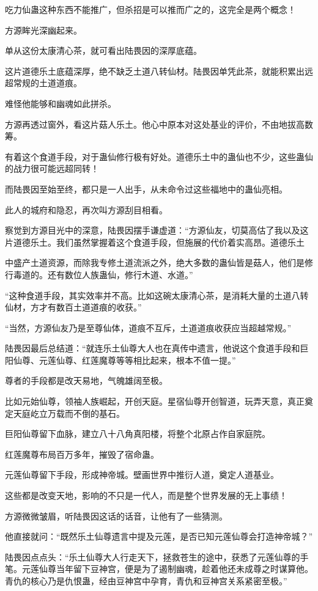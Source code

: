 \begin{this_body}
吃力仙蛊这种东西不能推广，但杀招是可以推而广之的，这完全是两个概念！

方源眸光深幽起来。

单从这份太康清心茶，就可看出陆畏因的深厚底蕴。

这片道德乐土底蕴深厚，绝不缺乏土道八转仙材。陆畏因单凭此茶，就能积累出远超常规的土道道痕。

难怪他能够和幽魂如此拼杀。

方源再透过窗外，看这片菇人乐土。他心中原本对这处基业的评价，不由地拔高数筹。

有着这个食道手段，对于蛊仙修行极有好处。道德乐土中的蛊仙也不少，这些蛊仙的战力很可能远超同转！

而陆畏因至始至终，都只是一人出手，从未命令过这些福地中的蛊仙亮相。

此人的城府和隐忍，再次叫方源刮目相看。

察觉到方源目光中的深意，陆畏因摆手谦虚道：“方源仙友，切莫高估了我以及这片道德乐土。我们虽然掌握着这个食道手段，但施展的代价着实高昂。道德乐土

中盛产土道资源，而除我专修土道流派之外，绝大多数的蛊仙皆是菇人，他们是修行毒道的。还有数位人族蛊仙，修行木道、水道。”

“这种食道手段，其实效率并不高。比如这碗太康清心茶，是消耗大量的土道八转仙材，方才有数百土道道痕的收获。”

“当然，方源仙友乃是至尊仙体，道痕不互斥，土道道痕收获应当超越常规。”

陆畏因最后总结道：“就连乐土仙尊大人也在真传中遗言，他说这个食道手段和巨阳仙尊、元莲仙尊、红莲魔尊等等相比起来，根本不值一提。”

尊者的手段都是改天易地，气魄雄阔至极。

比如元始仙尊，领袖人族崛起，开创天庭。星宿仙尊开创智道，玩弄天意，真正奠定天庭屹立万载而不倒的基石。

巨阳仙尊留下血脉，建立八十八角真阳楼，将整个北原占作自家庭院。

红莲魔尊布局百万多年，摧毁了宿命蛊。

元莲仙尊留下手段，形成神帝城。壁画世界中推衍人道，奠定人道基业。

这些都是改变天地，影响的不只是一代人，而是整个世界发展的无上事绩！

方源微微皱眉，听陆畏因这话的话音，让他有了一些猜测。

他直接就问：“既然乐土仙尊遗言中提及元莲，是否已知元莲仙尊会打造神帝城？”

陆畏因点点头：“乐土仙尊大人行走天下，拯救苍生的途中，获悉了元莲仙尊的手笔。元莲仙尊当年留下豆神宫，便是为了遏制幽魂，趁着他还未成尊之时谋算他。青仇的核心乃是仇恨蛊，经由豆神宫中孕育，青仇和豆神宫关系紧密至极。”


\end{this_body}
